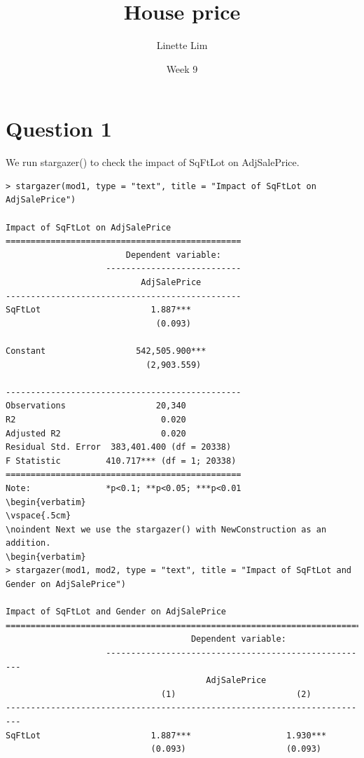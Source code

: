 \documentclass[12pt,letterpaper]{article}
\title{House price}
\date{Week 9}
\author{Linette Lim}
\begin{document}
	\section*{Question 1}
		\vspace{.25cm}
\noindent We run stargazer() to check the impact of SqFtLot on AdjSalePrice.
\begin{verbatim}
> stargazer(mod1, type = "text", title = "Impact of SqFtLot on AdjSalePrice")

Impact of SqFtLot on AdjSalePrice
===============================================
                        Dependent variable:    
                    ---------------------------
                           AdjSalePrice        
-----------------------------------------------
SqFtLot                      1.887***          
                              (0.093)          
                                               
Constant                  542,505.900***       
                            (2,903.559)        
                                               
-----------------------------------------------
Observations                  20,340           
R2                             0.020           
Adjusted R2                    0.020           
Residual Std. Error  383,401.400 (df = 20338)  
F Statistic         410.717*** (df = 1; 20338) 
===============================================
Note:               *p<0.1; **p<0.05; ***p<0.01
\begin{verbatim}
\vspace{.5cm}
\noindent Next we use the stargazer() with NewConstruction as an addition.
\begin{verbatim}
> stargazer(mod1, mod2, type = "text", title = "Impact of SqFtLot and Gender on AdjSalePrice")

Impact of SqFtLot and Gender on AdjSalePrice
=========================================================================
                                     Dependent variable:                 
                    -----------------------------------------------------
                                        AdjSalePrice                     
                               (1)                        (2)            
-------------------------------------------------------------------------
SqFtLot                      1.887***                   1.930***         
                             (0.093)                    (0.093)          
                                                                         

\end{verbatim}
\end{document}
